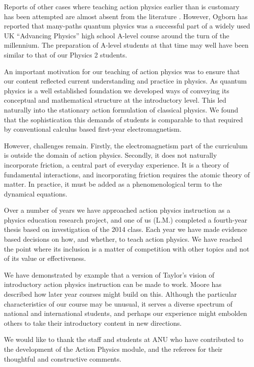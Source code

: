 \documentclass[prb,oncolumn]{revtex4-2}
\begin{document}
Reports of other cases where teaching action physics earlier than is customary has been attempted are almost absent from the literature \cite{Taylor2003}. However, Ogborn has reported that many-paths quantum physics was a successful part of a widely used UK ``Advancing Physics'' high school A-level course around the turn of the millennium. \cite{OgbornGirep2006} The preparation of A-level students at that time may well have been similar to that of our Physics 2 students.

An important motivation for our teaching of action physics was to ensure that our content reflected current understanding and practice in physics. As quantum physics is a well established foundation we developed ways of conveying its conceptual and mathematical structure at the introductory level. This led naturally into the stationary action formulation of classical physics. We found that the sophistication this demands of students is comparable to that required by conventional calculus based first-year electromagnetism.

However, challenges remain. Firstly, the electromagnetism part of the curriculum is outside the domain of action physics. Secondly, it does not naturally incorporate friction, a central part of everyday experience.  It is a theory of fundamental interactions, and incorporating friction requires the atomic theory of matter. In practice, it must be added as a phenomenological term to the dynamical equations. \cite{Goldstein}

Over a number of years we have approached action physics instruction as a physics education research project, \cite{McDermott} and one of us (L.M.) completed a fourth-year thesis based on investigation of the 2014 class. Each year we have made evidence based decisions on how, and whether, to teach action physics. We have reached the point where its inclusion is a matter of competition with other topics and not of its value or effectiveness. 

We have demonstrated by example that a version of Taylor's vision of introductory action physics instruction can be made to work. Moore has described how later year courses might build on this. \cite{Moore} Although the particular characteristics of our course may be unusual, it serves a diverse spectrum of national and international students, and perhaps our experience might embolden others to take their introductory content in new directions.

\begin{acknowledgments}

We would like to thank the staff and students at ANU who have contributed to the development of the Action Physics module, and the referees for their thoughtful and constructive comments.

\end{acknowledgments}
\end{document}
